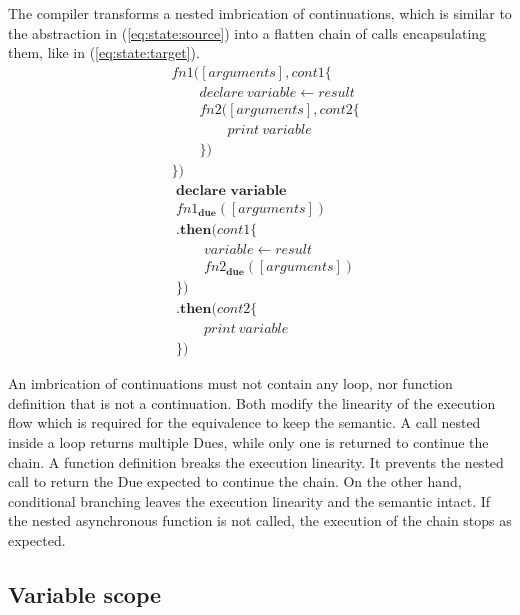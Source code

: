 The compiler transforms a nested imbrication of continuations, which is similar to the abstraction in (\ref{eq:state:source}) into a flatten chain of calls encapsulating them, like in (\ref{eq:state:target}).
\begin{align} \label{eq:state:source}
&fn1([arguments], cont1 \{\nonumber\\
&\qquad  declare ~ variable \leftarrow result\nonumber\\
&\qquad  fn2([arguments], cont2 \{\nonumber\\
&\qquad\qquad    print ~ variable\nonumber\\
&\qquad  \})\nonumber\\
&\})
\end{align}
\begin{align} \label{eq:state:target}
&\textbf{declare variable}\nonumber\\
&fn1_\textbf{due}([arguments])\nonumber\\
&\textbf{.then}(cont1\{\nonumber\\
&\qquad  variable \leftarrow result\nonumber\\
&\qquad  fn2_\textbf{due}([arguments])\nonumber\\
&\})\nonumber\\
&\textbf{.then}(cont2\{\nonumber\\
&\qquad  print ~ variable\nonumber\\
&\})
\end{align}

An imbrication of continuations must not contain any loop, nor function definition that is not a continuation.
Both modify the linearity of the execution flow which is required for the equivalence to keep the semantic.
A call nested inside a loop returns multiple Dues, while only one is returned to continue the chain.
A function definition breaks the execution linearity.
It prevents the nested call to return the Due expected to continue the chain.
On the other hand, conditional branching leaves the execution linearity and the semantic intact.
If the nested asynchronous function is not called, the execution of the chain stops as expected.


\subsection{Variable scope}

